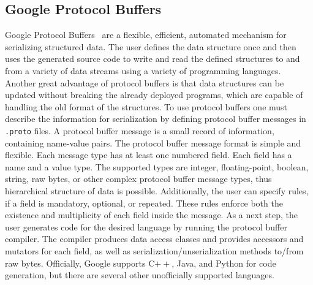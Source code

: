 \subsection{Google Protocol Buffers}
\label{protobuf}
Google Protocol Buffers~\cite{gpb2010} are a flexible, efficient, automated mechanism for serializing
structured data. The user defines the data structure once and then uses the generated source code to
write and read the defined structures to and from a variety of data streams using a variety of
programming languages. Another great advantage of protocol buffers is that data structures can
be updated without breaking the already deployed programs, which  are capable of handling the old
format of the structures.
To use protocol buffers one must describe the information for serialization by defining protocol
buffer messages in {\tt .proto} files. A protocol buffer message is a small record of information,
containing name-value pairs. The protocol buffer message format is  simple and flexible. Each
message type has at least one numbered field. Each field has a name and a value type. The supported
types are integer, floating-point, boolean, string, raw bytes, or other complex protocol buffer message
types, thus hierarchical structure of data is possible. Additionally, the user can specify rules,
if a field is mandatory, optional, or repeated. These rules enforce both the existence
and multiplicity of each field inside the message. As a next step, the user generates code for
the desired language by running the protocol buffer compiler.  The compiler produces data access
classes and provides accessors and mutators for each field, as well as serialization/unserialization
methods to/from raw bytes. Officially, Google supports C$++$, Java, and Python for code generation, but
there are several other unofficially supported languages.


